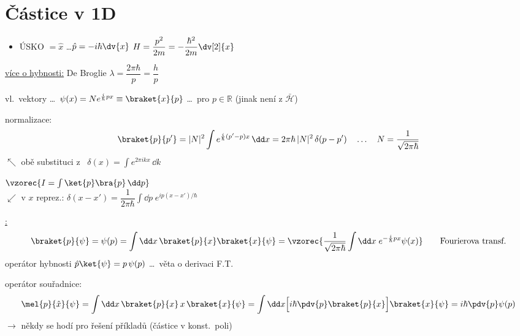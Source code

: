 \section{Částice v 1D}

\begin{itemize}
  \item ÚSKO $= \hat x$ \quad \dots\quad $\hat p = -i\hbar\dv{x}$ \qquad
        $H = \dfrac{p^2}{2m} = -\dfrac{\hbar^2}{2m}\dv[2]{x}$
\end{itemize}

\underline{více o hybnosti:} \hfill De Broglie \quad $\lambda = \dfrac{2\pi\hbar}{p} = \dfrac{h}{p}$
\quad {}

\quad vl.\ vektory \dots\ $\psi(x) = Ne^{\frac{i}{\hbar}px} \equiv \braket{x}{p}$ \quad \dots\ pro $p\in\mathbb{R}$ \quad (jinak není z $\bar{\mathcal{H}}$)

normalizace:
\[
  \braket{p}{p'} = |N|^2\int e^{\frac{i}{\hbar}(p'-p)x}\,\dd x = 2\pi\hbar\,|N|^2\,\delta(p - p')
  \quad\dots\quad N = \frac{1}{\sqrt{2\pi\hbar}}
\]
\quad $\nwarrow$ obě substituci z \ $\delta(x) = \int e^{2\pi ikx}\,\dd k$

 \quad $\vzorec{I = \int\ket{p}\bra{p}\,\dd p}$ \\
\quad $\swarrow$ v $x$ reprez.: \quad $\delta(x - x') = \dfrac{1}{2\pi\hbar}\displaystyle\int\dd p\; e^{ip(x-x')/\hbar}$

\underline{:}
\[
  \braket{p}{\psi} = \psi(p) = \int\dd x\,\braket{p}{x}\braket{x}{\psi}
  = \vzorec{\frac{1}{\sqrt{2\pi\hbar}}\int\dd x\; e^{-\frac{i}{\hbar}px}\psi(x)}
  \qquad\text{Fourierova transf.}
\]
operátor hybnosti \quad $\hat p\ket{\psi} = p\,\psi(p)$ \quad \dots\ věta o derivaci F.T.

operátor souřadnice:
\[
  \mel{p}{\hat x}{\psi} = \int\dd x\,\braket{p}{x}\,x\,\braket{x}{\psi}
  = \int\dd x\Big[i\hbar\pdv{p}\braket{p}{x}\Big]\braket{x}{\psi} = i\hbar\pdv{p}\psi(p)
\]
$\to$ někdy se hodí pro řešení příkladů (částice v konst.\ poli)

